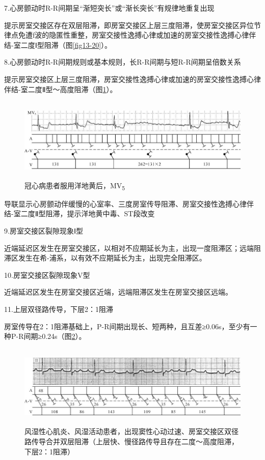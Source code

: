 7.心房颤动时R-R间期呈“渐短突长”或“渐长突长”有规律地重复出现

提示房室交接区存在双层阻滞，即房室交接区上层三度阻滞，使房室交接区异位节律点免遭f波的隐匿性重整，房室交接性逸搏心律或加速的房室交接性逸搏心律伴结-室二度Ⅰ型阻滞（图\ref{fig13-20}）。

8.心房颤动时R-R间期规则或基本规则，长R-R间期与短R-R间期呈倍数关系

提示房室交接区上层三度阻滞，房室交接性逸搏心律或加速的房室交接性逸搏心律伴结-室二度Ⅱ型～高度阻滞（图\ref{fig24-7}）。

\begin{figure}[!htbp]
 \centering
 \includegraphics[width=5.79167in,height=1.57292in]{./images/Image00402.jpg}
 \captionsetup{justification=centering}
 \caption{冠心病患者服用洋地黄后，MV\textsubscript{5}}
 \label{fig24-7}
  \end{figure} 
导联显示心房颤动伴缓慢的心室率、三度房室传导阻滞、房室交接性逸搏心律伴结-室二度Ⅱ型阻滞，提示洋地黄中毒、ST段改变

9.房室交接区裂隙现象Ⅰ型

近端延迟区发生在房室交接区，以相对不应期延长为主，出现一度阻滞区；远端阻滞区发生在希-浦系，以有效不应期延长为主，出现完全阻滞区。

10.房室交接区裂隙现象V型

近端延迟区发生在房室交接区近端，远端阻滞区发生在房室交接区远端。

11.上层双径路传导，下层2：1阻滞

房室传导在2：1阻滞基础上，P-R间期出现长、短两种，且互差≥0.06s，至少有一种P-R间期≥0.24s（图\ref{fig24-8}）。

\begin{figure}[!htbp]
 \centering
 \includegraphics[width=5.82292in,height=1.55208in]{./images/Image00403.jpg}
 \captionsetup{justification=centering}
 \caption{风湿性心肌炎、风湿活动患者，出现窦性心动过速、房室交接区双径路传导合并双层阻滞（上层快、慢径路传导且存在二度～高度阻滞，下层2：1阻滞）}
 \label{fig24-8}
  \end{figure} 

